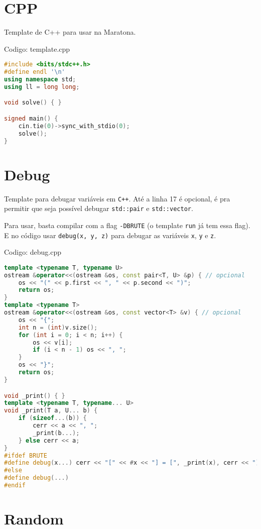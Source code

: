 \documentclass[10pt, a4paper, oneside]{book}
\begin{document}
\section{CPP}


Template de C++ para usar na Maratona.
\hfill

Codigo: template.cpp

\begin{lstlisting}[language=C++]
#include <bits/stdc++.h>
#define endl '\n'
using namespace std;
using ll = long long;

void solve() { }

signed main() {
    cin.tie(0)->sync_with_stdio(0);
    solve();
}
\end{lstlisting}
\hfill

\section{Debug}


Template para debugar variáveis em \texttt{C++}. Até a linha 17 é opcional, é pra permitir que seja possível debugar \texttt{std::pair} e \texttt{std::vector}.

Para usar, basta compilar com a flag \texttt{-DBRUTE} (o template \texttt{run} já tem essa flag). E no código usar \texttt{debug(x, y, z)} para debugar as variáveis \texttt{x}, \texttt{y} e \texttt{z}.
\hfill

Codigo: debug.cpp

\begin{lstlisting}[language=C++]
template <typename T, typename U>
ostream &operator<<(ostream &os, const pair<T, U> &p) { // opcional
    os << "(" << p.first << ", " << p.second << ")";
    return os;
}
template <typename T>
ostream &operator<<(ostream &os, const vector<T> &v) { // opcional
    os << "{";
    int n = (int)v.size();
    for (int i = 0; i < n; i++) {
        os << v[i];
        if (i < n - 1) os << ", ";
    }
    os << "}";
    return os;
}

void _print() { }
template <typename T, typename... U>
void _print(T a, U... b) {
    if (sizeof...(b)) {
        cerr << a << ", ";
        _print(b...);
    } else cerr << a;
}
#ifdef BRUTE
#define debug(x...) cerr << "[" << #x << "] = [", _print(x), cerr << "]" << endl
#else
#define debug(...)
#endif\end{lstlisting}
\hfill

\section{Random}
\end{document}
